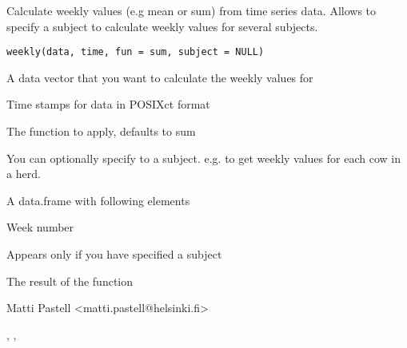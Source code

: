 \begin{Description}\relax
Calculate weekly values (e.g mean or sum) from time series data. Allows
to specify a subject to calculate weekly values for several subjects.
\end{Description}
\begin{Usage}
\begin{verbatim}
weekly(data, time, fun = sum, subject = NULL)
\end{verbatim}
\end{Usage}
\begin{Arguments}
\begin{ldescription}
\item[\code{data}] A data vector that you want to calculate the weekly values
for
\item[\code{time}] Time stamps for data in POSIXct format
\item[\code{fun}] The function to apply, defaults to sum
\item[\code{subject}] You can optionally specify to a subject. e.g. to get
weekly values for each cow in a herd.
\end{ldescription}
\end{Arguments}
\begin{Value}
A data.frame with following elements
\begin{ldescription}
\item[\code{Week}] Week number
\item[\code{Subject}] Appears only if you have specified a subject
\item[\code{Result}] The result of the function
\end{ldescription}
\end{Value}
\begin{Author}\relax
Matti Pastell <matti.pastell@helsinki.fi>
\end{Author}
\begin{SeeAlso}\relax
{}, ,
\end{SeeAlso}
\begin{Examples}
\end{Examples}

